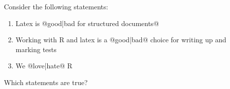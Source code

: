 \documentclass[10pt]{examdesign}
\begin{document}
\begin{multiplechoice}[resetcounter=no,  examcolumns=1]
\begin{question}
	
	
\end{question}


\begin{question}
	
	Consider the following statements:
	
	\begin{enumerate}[I]
		\item Latex is @{good}|{bad} for structured documents@
		
		\item Working with R and latex is a @{good}|{bad}@ choice for writing up and marking tests
		
		\item We @{love}|{hate}@ R
		
	\end{enumerate}
	
	Which statements are true?
	
	
\end{question}

\end{multiplechoice}
\end{document}
